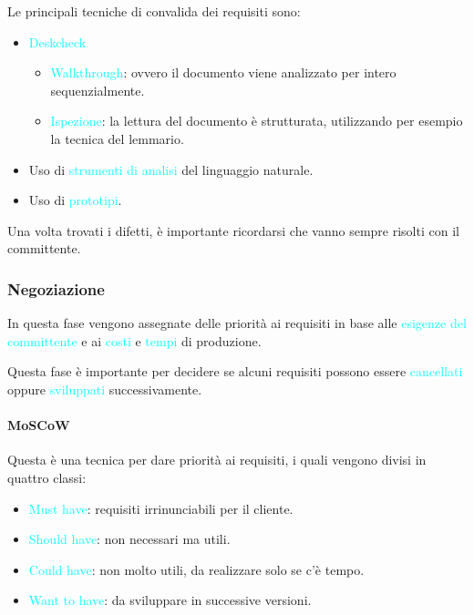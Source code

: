 Le principali tecniche di convalida dei requisiti sono:
\begin{itemize}
    \item \textcolor{cyan}{Deskcheck}
        \begin{itemize}
            \item \textcolor{cyan}{Walkthrough}: ovvero il documento viene analizzato per intero sequenzialmente.
            \item \textcolor{cyan}{Ispezione}: la lettura del documento è strutturata, utilizzando per esempio la tecnica del
                lemmario.
        \end{itemize}
    \item Uso di \textcolor{cyan}{strumenti di analisi} del linguaggio naturale.
    \item Uso di \textcolor{cyan}{prototipi}.
\end{itemize}

Una volta trovati i difetti, è importante ricordarsi che vanno sempre risolti con
il committente.

\subsubsection{Negoziazione}

In questa fase vengono assegnate delle priorità ai requisiti in base alle
\textcolor{cyan}{esigenze del committente} e ai \textcolor{cyan}{costi} e \textcolor{cyan}{tempi} di
produzione.

Questa fase è importante per decidere se alcuni requisiti possono essere \textcolor{cyan}{cancellati} oppure
\textcolor{cyan}{sviluppati} successivamente.

\paragraph{MoSCoW} Questa è una tecnica per dare priorità ai requisiti, i quali vengono divisi in quattro classi:
\begin{itemize}
    \item \textcolor{cyan}{Must have}: requisiti irrinunciabili per il cliente.
    \item \textcolor{cyan}{Should have}: non necessari ma utili.
    \item \textcolor{cyan}{Could have}: non molto utili, da realizzare solo se c'è tempo.
    \item \textcolor{cyan}{Want to have}: da sviluppare in successive versioni.
\end{itemize}

